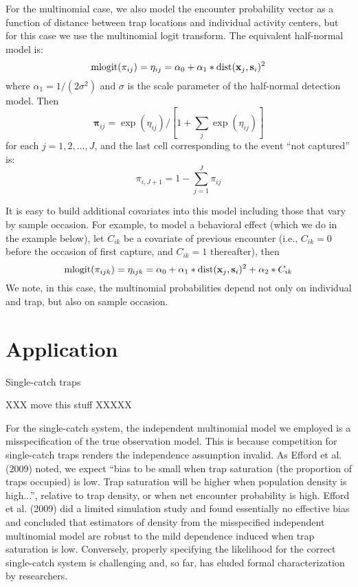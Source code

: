 For the multinomial case, we also model the encounter probability
vector as a function of distance between trap locations and individual
activity centers, but for this case we use the multinomial logit
transform. The equivalent half-normal model is:
\begin{equation}
\mbox{mlogit}(\pi_{ij}) = \eta_{ij}  =  \alpha_0 + \alpha_{1} *
\mbox{dist}({\bf x}_{j},{\bf s}_{i})^2   
\label{eq.logit}
\end{equation}
where $\alpha_{1} = 1/(2\sigma^2)$ and $\sigma$ is the scale
parameter of the half-normal detection model.  Then
\[
{\bm \pi}_{ij} = \exp(\eta_{ij})/[ 1 + \sum_{j} \exp(\eta_{ij}) ]
\]
for each $j=1,2,\ldots,J$, and the last cell corresponding to the
event ``not captured'' is:
\[
\pi_{i,J+1} = 1- \sum_{j=1}^{J} \pi_{ij}
\]

It is easy to build additional covariates into this model including
those that vary by sample occasion. For example, to model a behavioral
effect (which we do in the example below), let 
$C_{ik}$ be a covariate of previous encounter
(i.e., $C_{ik} = 0$ before the occasion of first capture, and $C_{ik}
= 1$ thereafter), then
\[
\mbox{mlogit}(\pi_{ijk}) = \eta_{ijk} = \alpha_{0}  +\alpha_{1}*\mbox{dist}({\bf  x}_{j},{\bf s}_{i})^2 +  \alpha_{2}*C_{ik}
\]
We note, in this case, the multinomial probabilities depend not only
on individual and trap, but also on sample occasion.



\section{Application}

Single-catch traps

XXX move this stuff XXXXX

 For the single-catch
system, the independent multinomial model we employed is a
misspecification of the true observation model.  This is because
competition for single-catch traps renders the independence assumption
invalid. As Efford et al. (2009) noted, we expect ``bias to be small
when trap saturation (the proportion of traps occupied) is low.  Trap
saturation will be higher when population density is high...'',
relative to trap density, or when net encounter probability is high.
Efford et al. (2009) did a limited simulation study and found essentially no
effective bias and concluded that estimators of density from the
misspecified independent multinomial model are robust to the mild
dependence induced when trap saturation is low. Conversely, properly
specifying the likelihood for the correct single-catch system is
challenging and, so far, has eluded formal characterization by
researchers.


